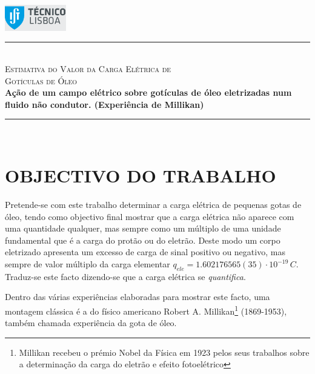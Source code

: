 \documentclass[a4paper,twoside,12pt]{article}      %
\author{Prof. Bernardo B. Carvalho}
\date{ Setembro 2012}
\newcommand{\HRule}{\rule{\linewidth}{0.5mm}}
\begin{document}
 

	\includegraphics[width=0.2\textwidth]{../logo-ist}%

		\HRule \\[0.5cm]
	{ \huge \sf  \textsc{Estimativa do Valor da Carga Elétrica de \\
		Gotículas de Óleo} }\\[0.4cm] %
	{ \large \bfseries  
Ação de um campo elétrico sobre gotículas de óleo eletrizadas num fluido não 
condutor. (Experiência de Millikan)}\\
	\HRule \\%




\section{\sf OBJECTIVO DO TRABALHO}
Pretende-se com este trabalho determinar a carga elétrica de pequenas gotas de óleo, tendo como objectivo final mostrar que a carga elétrica não aparece com uma quantidade qualquer, mas sempre como um múltiplo de uma unidade fundamental que é a carga do protão ou do eletrão. Deste modo um corpo eletrizado apresenta um excesso de carga de sinal positivo ou negativo, mas sempre de valor múltiplo da carga elementar $q_{ele}= 1.602176565(35)\cdot 10^{-19}\,C$.
Traduz-se este facto dizendo-se que a carga elétrica se \emph{quantifica}.

Dentro das várias experiências elaboradas para mostrar este facto, uma montagem clássica é a do físico americano Robert A. Millikan\footnote{Millikan recebeu o prémio Nobel da Física em 1923 pelos seus trabalhos sobre a determinação da carga do eletrão e efeito fotoelétrico } (1869-1953), também chamada experiência da gota de óleo.
\end{document}
